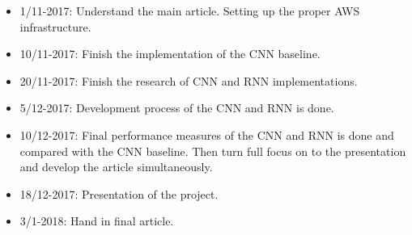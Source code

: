 \documentclass[11pt]{article}
\begin{document}
\begin{multicols}{2}
\begin{itemize}
\item 1/11-2017: Understand the main article. Setting up the proper AWS infrastructure.
\item 10/11-2017: Finish the implementation of the CNN baseline.
\item 20/11-2017:  Finish the research of CNN and RNN implementations.
\item 5/12-2017: Development process of the CNN and RNN is done.
\item 10/12-2017: Final performance measures of the CNN and RNN is done and compared with the CNN baseline. Then turn full focus on to the presentation and develop the article simultaneously.
\item 18/12-2017: Presentation of the project. 
\item 3/1-2018: Hand in final article.
\end{itemize}
\end{multicols}



{\footnotesize \printbibliography}
\end{document}

